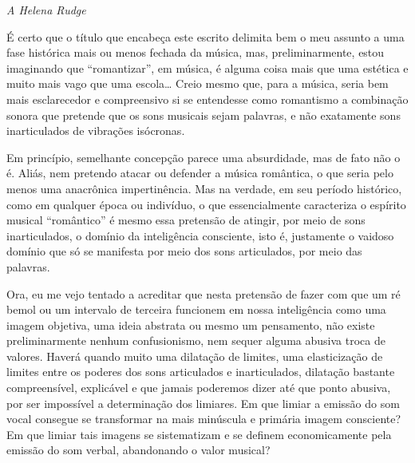 

\begin{flushright}
\emph{A Helena Rudge}
\end{flushright}

\noindent{}É certo que o título que encabeça este escrito delimita bem o meu
assunto a uma fase histórica mais ou menos fechada da música, mas,
preliminarmente, estou imaginando que ``romantizar'', em música, é
alguma coisa mais que uma estética e muito mais vago que uma escola\ldots{}
Creio mesmo que, para a música, seria bem mais esclarecedor e
compreensivo si se entendesse como romantismo a combinação sonora que
pretende que os sons musicais sejam palavras, e não exatamente sons
inarticulados de vibrações isócronas.

Em princípio, semelhante concepção parece uma absurdidade, mas de fato
não o é. Aliás, nem pretendo atacar ou defender a música romântica, o
que seria pelo menos uma anacrônica impertinência. Mas na verdade, em
seu período histórico, como em qualquer época ou indivíduo, o que
essencialmente caracteriza o espírito musical ``romântico'' é mesmo essa
pretensão de atingir, por meio de sons inarticulados, o domínio da
inteligência consciente, isto é, justamente o vaidoso domínio que só se
manifesta por meio dos sons articulados, por meio das palavras.

Ora, eu me vejo tentado a acreditar que nesta pretensão de fazer com que
um ré bemol ou um intervalo de terceira funcionem em nossa inteligência
como uma imagem objetiva, uma ideia abstrata ou mesmo um pensamento, não
existe preliminarmente nenhum confusionismo, nem sequer alguma abusiva
troca de valores. Haverá quando muito uma dilatação de limites, uma
elasticização de limites entre os poderes dos sons articulados e
inarticulados, dilatação bastante compreensível, explicável e que jamais
poderemos dizer até que ponto abusiva, por ser impossível a determinação
dos limiares. Em que limiar a emissão do som vocal consegue se
transformar na mais minúscula e primária imagem consciente? Em que
limiar tais imagens se sistematizam e se definem economicamente pela
emissão do som verbal, abandonando o valor musical?

